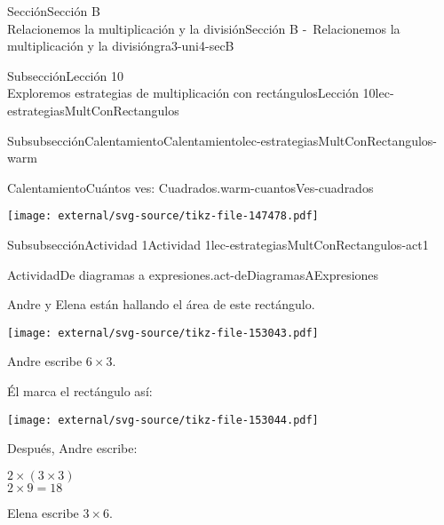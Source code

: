 \begin{sectionptx}{Sección}{{\Large Sección B\\}Relacionemos la multiplicación y la división}{}{Sección B -~Relacionemos la multiplicación y la división}{}{}{gra3-uni4-secB}
\begin{subsectionptx}{Subsección}{{\normalsize Lección 10\\[-0.05cm]}Exploremos estrategias de multiplicación con rectángulos}{}{Lección 10}{}{}{lec-estrategiasMultConRectangulos}
\begin{subsubsectionptx}{Subsubsección}{Calentamiento}{}{Calentamiento}{}{}{lec-estrategiasMultConRectangulos-warm}
\begin{exploration}{Calentamiento}{Cuántos ves: Cuadrados.}{warm-cuantosVes-cuadrados}
\begin{minipage}[t]{0.6\textwidth}
\begin{sidebyside}{3}{0}{0}{0.05}
\begin{sbspanel}{0.3}
\end{sbspanel}%
\begin{sbspanel}{0.3}%
\texttt{[image: external/svg-source/tikz-file-147478.pdf]}
\end{sbspanel}%
\end{sidebyside}%
\end{minipage}
\end{exploration}%
\end{subsubsectionptx}
%
%
\typeout{************************************************}
\typeout{************************************************}
%
\begin{subsubsectionptx}{Subsubsección}{Actividad 1}{}{Actividad 1}{}{}{lec-estrategiasMultConRectangulos-act1}
\begin{activity}{Actividad}{De diagramas a expresiones.}{act-deDiagramasAExpresiones}%
\begin{sidebyside}{2}{0.025}{0.025}{0.05}%
\begin{sbspanel}{0.4}%
Andre y Elena están hallando el área de este rectángulo.%
\end{sbspanel}%
\begin{sbspanel}{0.5}%
\texttt{[image: external/svg-source/tikz-file-153043.pdf]}
\end{sbspanel}%
\end{sidebyside}%
\begin{sidebyside}{3}{0}{0}{0.065}%
\begin{sbspanel}{0.27}%
Andre escribe \(6\times 3\).%
\end{sbspanel}%
\begin{sbspanel}{0.35}%
Él marca el rectángulo así:%
\par
\texttt{[image: external/svg-source/tikz-file-153044.pdf]}
\end{sbspanel}%
\begin{sbspanel}{0.25}%
Después, Andre escribe:%
\par
\(2 \times (3 \times 3)\)\\
 \(2 \times 9 = 18\)%
\end{sbspanel}%
\end{sidebyside}%
\begin{sidebyside}{3}{0}{0}{0.065}%
\begin{sbspanel}{0.27}%
Elena escribe \(3\times 6\).%
\end{sbspanel}%
\begin{sbspanel}{0.35}%

\end{sbspanel}
\end{sidebyside}
\end{activity}
\end{subsubsectionptx}
\end{subsectionptx}
\end{sectionptx}
